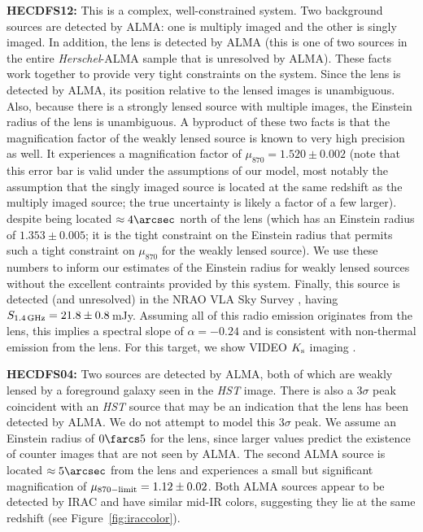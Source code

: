 \documentclass[iop]{emulateapj}
\begin{document}
{\bf HECDFS12:} This is a complex, well-constrained system.  Two background
sources are detected by ALMA: one is multiply imaged and the other is singly
imaged.  In addition, the lens is detected by ALMA (this is one of two sources
in the entire {\it Herschel}-ALMA sample that is unresolved by ALMA).  These
facts work together to provide very tight constraints on the system.  Since the
lens is detected by ALMA, its position relative to the lensed images is
unambiguous.  Also, because there is a strongly lensed source with multiple
images, the Einstein radius of the lens is unambiguous.  A byproduct of these
two facts is that the magnification factor of the weakly lensed source is known
to very high precision as well.  It experiences a magnification factor of
$\mu_{870} = 1.520\pm0.002$ (note that this error bar is valid under the
assumptions of our model, most notably the assumption that the singly imaged
source is located at the same redshift as the multiply imaged source; the true
uncertainty is likely a factor of a few larger).  despite being located
$\approx4\arcsec$ north of the lens (which has an Einstein radius of
$1.353\pm0.005$; it is the tight constraint on the Einstein radius that permits
such a tight constraint on $\mu_{870}$ for the weakly lensed source).  We use
these numbers to inform our estimates of the Einstein radius for weakly lensed
sources without the excellent contraints provided by this system.  Finally,
this source is detected (and unresolved) in the NRAO VLA Sky Survey
\citep{Condon:1998uq}, having $S_{\rm 1.4\,GHz} = 21.8 \pm 0.8\,$mJy.  Assuming
all of this radio emission originates from the lens, this implies a spectral
slope of $\alpha = -0.24$ and is consistent with non-thermal emission from the
lens.  For this target, we show VIDEO $K_{\rm s}$ imaging
\citep{Jarvis:2013lr}.

{\bf HECDFS04:} Two sources are detected by ALMA, both of which are weakly
lensed by a foreground galaxy seen in the {\it HST} image.  There is also a
3$\sigma$ peak coincident with an {\it HST} source that may be an indication
that the lens has been detected by ALMA.  We do not attempt to model this
3$\sigma$ peak.  We assume an Einstein radius of $0\farcs5$ for the lens, since
larger values predict the existence of counter images that are not seen by
ALMA.  The second ALMA source is located $\approx5\arcsec$ from the lens and
experiences a small but significant magnification of $\mu_{\rm 870-limit} =
1.12 \pm 0.02$.  Both ALMA sources appear to be detected by IRAC and have
similar mid-IR colors, suggesting they lie at the same redshift (see
Figure~\ref{fig:iraccolor}).  
\end{document}
